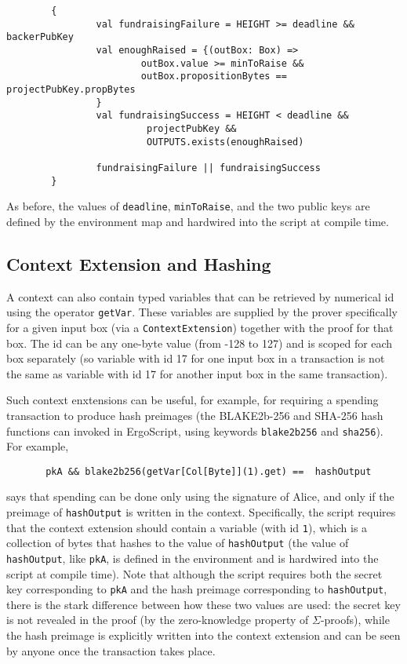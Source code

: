 \documentclass[11pt]{article}
\newcommand{\langname}{ErgoScript\xspace}
\begin{document}
\begin{verbatim}
        {
                val fundraisingFailure = HEIGHT >= deadline && backerPubKey
                val enoughRaised = {(outBox: Box) =>
                        outBox.value >= minToRaise && 
                        outBox.propositionBytes == projectPubKey.propBytes
                }
                val fundraisingSuccess = HEIGHT < deadline &&
                         projectPubKey &&  
                         OUTPUTS.exists(enoughRaised)
                 
                fundraisingFailure || fundraisingSuccess
        }
\end{verbatim}

As before, the values of \texttt{deadline}, \texttt{minToRaise}, and the two public keys are defined by the environment map and hardwired into the script at compile time. 


\subsection{Context Extension and Hashing}
\label{sec:extension}
A context can also contain typed variables that can be retrieved by numerical id using the operator \texttt{getVar}. These variables are supplied by the prover specifically for a given input box (via a \texttt{ContextExtension}) together with the proof for that box. The id can be any one-byte value (from -128 to 127) and is scoped for each box separately (so variable with id 17 for one input box in a transaction is not the same as variable with id 17 for another input box in the same transaction).

Such context enxtensions can be useful, for example, for requiring a spending transaction to produce hash preimages (the BLAKE2b-256 and SHA-256 hash functions can invoked in \langname, using keywords \texttt{blake2b256} and \texttt{sha256}). For example,
\begin{verbatim}
       pkA && blake2b256(getVar[Col[Byte]](1).get) ==  hashOutput
\end{verbatim}
says that spending can be done only using the signature of Alice, and only if the preimage of \texttt{hashOutput} is written in the context. Specifically, the script requires that the context extension should contain a variable (with id \texttt{1}), which is a collection of bytes that hashes to the value of \texttt{hashOutput} (the value of \texttt{hashOutput}, like \texttt{pkA}, is defined in the environment and is hardwired into the script at compile time).  Note that although the script requires both the secret key corresponding to \texttt{pkA} and the hash preimage corresponding to \texttt{hashOutput}, there is the stark difference between how these two values are used: the secret key is not revealed in the proof (by the zero-knowledge property of $\Sigma$-proofs), while the hash preimage is explicitly written into the context extension and can be seen by anyone once the transaction takes place.
\end{document}
